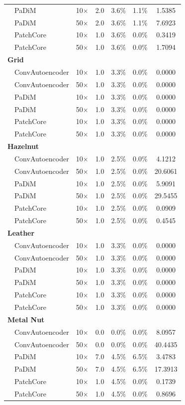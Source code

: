 \begin{table}[t]
{\begin{tabular}{llccccc}
 & PaDiM & 10$\times$ & 2.0 & 3.6\% & 1.1\% & 1.5385 \\
 & PaDiM & 50$\times$ & 2.0 & 3.6\% & 1.1\% & 7.6923 \\
 & PatchCore & 10$\times$ & 1.0 & 3.6\% & 0.0\% & 0.3419 \\
 & PatchCore & 50$\times$ & 1.0 & 3.6\% & 0.0\% & 1.7094 \\
\midrule
\multicolumn{7}{l}{\textbf{Grid}} \\
 & ConvAutoencoder & 10$\times$ & 1.0 & 3.3\% & 0.0\% & 0.0000 \\
 & ConvAutoencoder & 50$\times$ & 1.0 & 3.3\% & 0.0\% & 0.0000 \\
 & PaDiM & 10$\times$ & 1.0 & 3.3\% & 0.0\% & 0.0000 \\
 & PaDiM & 50$\times$ & 1.0 & 3.3\% & 0.0\% & 0.0000 \\
 & PatchCore & 10$\times$ & 1.0 & 3.3\% & 0.0\% & 0.0000 \\
 & PatchCore & 50$\times$ & 1.0 & 3.3\% & 0.0\% & 0.0000 \\
\midrule
\multicolumn{7}{l}{\textbf{Hazelnut}} \\
 & ConvAutoencoder & 10$\times$ & 1.0 & 2.5\% & 0.0\% & 4.1212 \\
 & ConvAutoencoder & 50$\times$ & 1.0 & 2.5\% & 0.0\% & 20.6061 \\
 & PaDiM & 10$\times$ & 1.0 & 2.5\% & 0.0\% & 5.9091 \\
 & PaDiM & 50$\times$ & 1.0 & 2.5\% & 0.0\% & 29.5455 \\
 & PatchCore & 10$\times$ & 1.0 & 2.5\% & 0.0\% & 0.0909 \\
 & PatchCore & 50$\times$ & 1.0 & 2.5\% & 0.0\% & 0.4545 \\
\midrule
\multicolumn{7}{l}{\textbf{Leather}} \\
 & ConvAutoencoder & 10$\times$ & 1.0 & 3.3\% & 0.0\% & 0.0000 \\
 & ConvAutoencoder & 50$\times$ & 1.0 & 3.3\% & 0.0\% & 0.0000 \\
 & PaDiM & 10$\times$ & 1.0 & 3.3\% & 0.0\% & 0.0000 \\
 & PaDiM & 50$\times$ & 1.0 & 3.3\% & 0.0\% & 0.0000 \\
 & PatchCore & 10$\times$ & 1.0 & 3.3\% & 0.0\% & 0.0000 \\
 & PatchCore & 50$\times$ & 1.0 & 3.3\% & 0.0\% & 0.0000 \\
\midrule
\multicolumn{7}{l}{\textbf{Metal Nut}} \\
 & ConvAutoencoder & 10$\times$ & 0.0 & 0.0\% & 0.0\% & 8.0957 \\
 & ConvAutoencoder & 50$\times$ & 0.0 & 0.0\% & 0.0\% & 40.4435 \\
 & PaDiM & 10$\times$ & 7.0 & 4.5\% & 6.5\% & 3.4783 \\
 & PaDiM & 50$\times$ & 7.0 & 4.5\% & 6.5\% & 17.3913 \\
 & PatchCore & 10$\times$ & 1.0 & 4.5\% & 0.0\% & 0.1739 \\
 & PatchCore & 50$\times$ & 1.0 & 4.5\% & 0.0\% & 0.8696 \\
\bottomrule
\end{tabular}}
\end{table}

